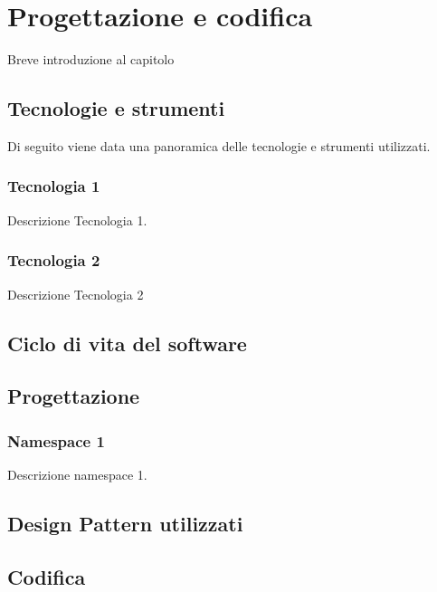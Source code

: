 \chapter{Progettazione e codifica}
\label{chap:progettazione-codifica}
Breve introduzione al capitolo

\section{Tecnologie e strumenti}
\label{sec:tecnologie-strumenti}
Di seguito viene data una panoramica delle tecnologie e strumenti utilizzati.

\subsection*{Tecnologia 1}
Descrizione Tecnologia 1.

\subsection*{Tecnologia 2}
Descrizione Tecnologia 2

\section{Ciclo di vita del software}
\label{sec:ciclo-vita-software}

\section{Progettazione}
\label{sec:progettazione}

\subsection{Namespace 1}
Descrizione namespace 1.

\section{Design Pattern utilizzati}

\section{Codifica}

\newpage